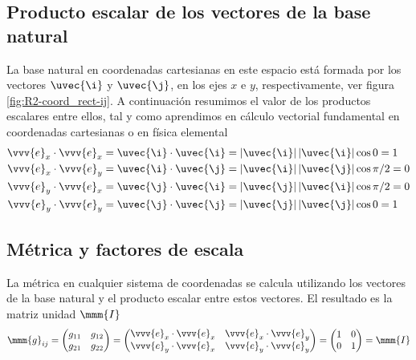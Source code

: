 \subsection{Producto escalar de los vectores de la base natural}
La base natural en coordenadas cartesianas en este espacio está formada por los vectores
$\uvec{\i}$ y $\uvec{\j}$, en los ejes $x$ e $y$, respectivamente, ver figura
\ref{fig:R2-coord_rect-ij}.
A continuación resumimos el valor de los productos escalares entre ellos, tal y como
aprendimos en cálculo vectorial fundamental en coordenadas cartesianas o en física
elemental
\begin{subequations}
  \begin{align}
    \label{eq:R2-cart-ii_prod_escalar}
    \vvv{e}_x\cdot\vvv{e}_x = \uvec{\i}\cdot\uvec{\i}
    &= |\uvec{\i}|\,|\uvec{\i}|\cos 0 = 1\\
    \label{eq:R2-cart-ij_prod_escalar}    
    \vvv{e}_x\cdot\vvv{e}_y = \uvec{\i}\cdot\uvec{\j}
    &= |\uvec{\i}|\,|\uvec{\j}|\cos\pi/2 = 0\\
    \label{eq:R2-cart-ji_prod_escalar} 
    \vvv{e}_y\cdot\vvv{e}_x = \uvec{\j}\cdot\uvec{\i}
    &= |\uvec{\j}|\,|\uvec{\i}|\cos\pi/2 = 0\\
    \label{eq:R2-cart-jj_prod_escalar}
    \vvv{e}_y\cdot\vvv{e}_y = \uvec{\j}\cdot\uvec{\j}
    &= |\uvec{\j}|\,|\uvec{\j}|\cos 0 = 1
  \end{align}
\end{subequations}

\subsection{Métrica y factores de escala}
La métrica en cualquier sistema de coordenadas se calcula utilizando los vectores de la
base natural y el producto escalar entre estos vectores. El resultado es la matriz
unidad $\mmm{I}$
\begin{equation}\label{eq:R2-cart-metrica}
  \mmm{g}_{ij}
  = \begin{pmatrix}
    g_{11} & g_{12}\\
    g_{21} & g_{22}
    \end{pmatrix}
  = \begin{pmatrix}
      \vvv{e}_x\cdot\vvv{e}_x & \vvv{e}_x\cdot\vvv{e}_y\\
      \vvv{e}_y\cdot\vvv{e}_x & \vvv{e}_y\cdot\vvv{e}_y
  \end{pmatrix}
  = \begin{pmatrix}
    1 & 0\\
    0 & 1
  \end{pmatrix}
  = \mmm{I}
\end{equation}

